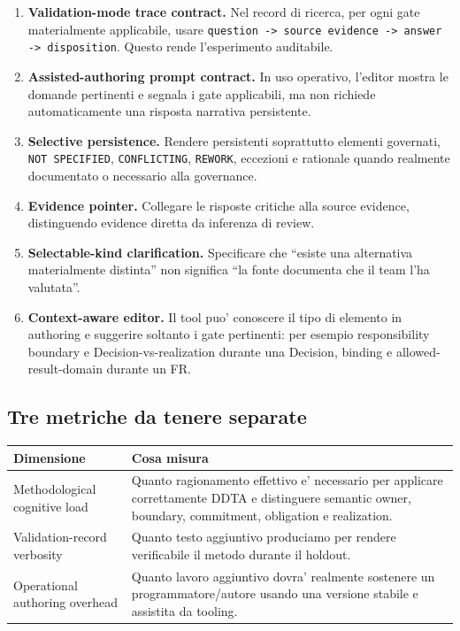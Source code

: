 \documentclass[11pt,a4paper]{article}
\begin{document}
\begin{ddtaworking}[title={Candidati da verificare, non ancora promossi}]
\begin{enumerate}
  \item \textbf{Validation-mode trace contract.} Nel record di ricerca, per ogni gate materialmente applicabile, usare \texttt{question -> source evidence -> answer -> disposition}. Questo rende l'esperimento auditabile.
  \item \textbf{Assisted-authoring prompt contract.} In uso operativo, l'editor mostra le domande pertinenti e segnala i gate applicabili, ma non richiede automaticamente una risposta narrativa persistente.
  \item \textbf{Selective persistence.} Rendere persistenti soprattutto elementi governati, \texttt{NOT SPECIFIED}, \texttt{CONFLICTING}, \texttt{REWORK}, eccezioni e rationale quando realmente documentato o necessario alla governance.
  \item \textbf{Evidence pointer.} Collegare le risposte critiche alla source evidence, distinguendo evidence diretta da inferenza di review.
  \item \textbf{Selectable-kind clarification.} Specificare che ``esiste una alternativa materialmente distinta'' non significa ``la fonte documenta che il team l'ha valutata''.
  \item \textbf{Context-aware editor.} Il tool puo' conoscere il tipo di elemento in authoring e suggerire soltanto i gate pertinenti: per esempio responsibility boundary e Decision-vs-realization durante una Decision, binding e allowed-result-domain durante un FR.
\end{enumerate}
\end{ddtaworking}

\subsection{Tre metriche da tenere separate}

\begin{tabularx}{\textwidth}{L{55mm}Y}
\toprule
\textbf{Dimensione} & \textbf{Cosa misura} \\
\midrule
Methodological cognitive load & Quanto ragionamento effettivo e' necessario per applicare correttamente DDTA e distinguere semantic owner, boundary, commitment, obligation e realization. \\
Validation-record verbosity & Quanto testo aggiuntivo produciamo per rendere verificabile il metodo durante il holdout. \\
Operational authoring overhead & Quanto lavoro aggiuntivo dovra' realmente sostenere un programmatore/autore usando una versione stabile e assistita da tooling. \\
\bottomrule
\end{tabularx}
\end{document}
